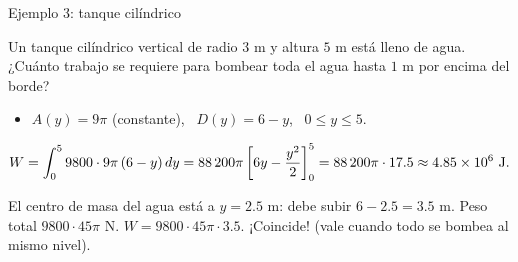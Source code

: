 \documentclass[10pt,aspectratio=169]{beamer}
\begin{document}
\begin{frame}{Ejemplo 3: tanque cilíndrico}
  \begin{ejemplo}
    Un tanque cilíndrico vertical de radio $3$ m y altura $5$ m está lleno de agua. ¿Cuánto trabajo se requiere para
    bombear toda el agua hasta $1$ m por encima del borde?
    \begin{itemize}
      \item $A(y)=9\pi$ (constante), \ $D(y)=6-y$, \ $0\le y\le5$.
    \end{itemize}
    \[ W=\int_0^5 9800\cdot9\pi\,(6-y)\dy=88\,200\pi\left[6y-\frac{y^2}2\right]_0^5=88\,200\pi\cdot17.5\approx4.85\times10^6\ \text{J}. \]
  \end{ejemplo}
  \begin{observacion}
    El centro de masa del agua está a $y=2.5$ m: debe subir $6-2.5=3.5$ m. Peso total $9800\cdot45\pi$ N.
    $W=9800\cdot45\pi\cdot3.5$. ¡Coincide! (vale cuando todo se bombea al mismo nivel).
  \end{observacion}
\end{frame}
\end{document}
